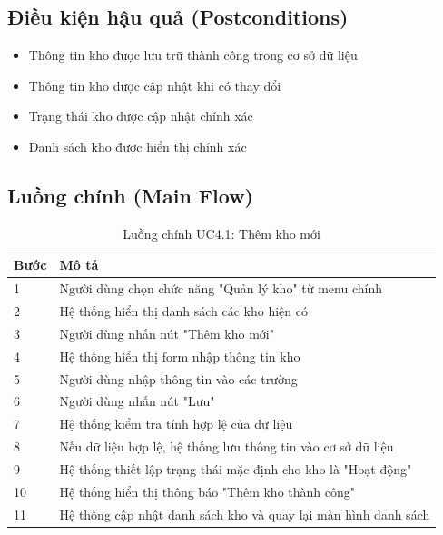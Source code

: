 \documentclass[a4paper,12pt]{article}
\begin{document}
\subsection{Điều kiện hậu quả (Postconditions)}
\begin{itemize}
    \item Thông tin kho được lưu trữ thành công trong cơ sở dữ liệu
    \item Thông tin kho được cập nhật khi có thay đổi
    \item Trạng thái kho được cập nhật chính xác
    \item Danh sách kho được hiển thị chính xác
\end{itemize}

\subsection{Luồng chính (Main Flow)}

\begin{table}[h]
\centering
\renewcommand{\arraystretch}{0.85}
\begin{tabular}{|p{1.5cm}|p{10cm}|}
\hline
\textbf{Bước} & \textbf{Mô tả} \\
\hline
1 & Người dùng chọn chức năng "Quản lý kho" từ menu chính \\
\hline
2 & Hệ thống hiển thị danh sách các kho hiện có \\
\hline
3 & Người dùng nhấn nút "Thêm kho mới" \\
\hline
4 & Hệ thống hiển thị form nhập thông tin kho \\
\hline
5 & Người dùng nhập thông tin vào các trường \\
\hline
6 & Người dùng nhấn nút "Lưu" \\
\hline
7 & Hệ thống kiểm tra tính hợp lệ của dữ liệu \\
\hline
8 & Nếu dữ liệu hợp lệ, hệ thống lưu thông tin vào cơ sở dữ liệu \\
\hline
9 & Hệ thống thiết lập trạng thái mặc định cho kho là "Hoạt động" \\
\hline
10 & Hệ thống hiển thị thông báo "Thêm kho thành công" \\
\hline
11 & Hệ thống cập nhật danh sách kho và quay lại màn hình danh sách \\
\hline
\end{tabular}
\caption{Luồng chính UC4.1: Thêm kho mới}
\end{table}
\end{document}
